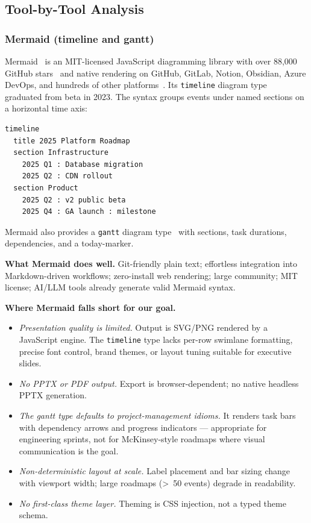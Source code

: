 \subsection{Tool-by-Tool Analysis}

\subsubsection{Mermaid (timeline and gantt)}

Mermaid~\cite{mermaid2023} is an MIT-licensed JavaScript diagramming library
with over 88{,}000 GitHub stars~\cite{mermaidwiki} and native rendering on
GitHub, GitLab, Notion, Obsidian, Azure DevOps, and hundreds of other
platforms~\cite{mermaid2023}.
Its \texttt{timeline} diagram type~\cite{mermaiddocs2024} graduated from beta
in 2023.
The syntax groups events under named sections on a horizontal time axis:

\begin{Verbatim}[fontsize=\small]
timeline
  title 2025 Platform Roadmap
  section Infrastructure
    2025 Q1 : Database migration
    2025 Q2 : CDN rollout
  section Product
    2025 Q2 : v2 public beta
    2025 Q4 : GA launch : milestone
\end{Verbatim}

\noindent
Mermaid also provides a \texttt{gantt} diagram type~\cite{mermaidgantt2024}
with sections, task durations, dependencies, and a today-marker.

\medskip\noindent
\textbf{What Mermaid does well.}
Git-friendly plain text; effortless integration into Markdown-driven
workflows; zero-install web rendering; large community; MIT license;
AI/LLM tools already generate valid Mermaid syntax.

\medskip\noindent
\textbf{Where Mermaid falls short for our goal.}
\begin{itemize}
  \item \emph{Presentation quality is limited.}
        Output is SVG/PNG rendered by a JavaScript engine. The \texttt{timeline}
        type lacks per-row swimlane formatting, precise font control, brand
        themes, or layout tuning suitable for executive slides.
  \item \emph{No PPTX or PDF output.}
        Export is browser-dependent; no native headless PPTX generation.
  \item \emph{The gantt type defaults to project-management idioms.}
        It renders task bars with dependency arrows and progress indicators ---
        appropriate for engineering sprints, not for McKinsey-style roadmaps
        where visual communication is the goal.
  \item \emph{Non-deterministic layout at scale.}
        Label placement and bar sizing change with viewport width; large
        roadmaps (>~50 events) degrade in readability.
  \item \emph{No first-class theme layer.}
        Theming is CSS injection, not a typed theme schema.
\end{itemize}

